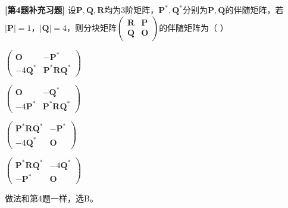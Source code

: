 \begin{question}\textbf{[第4题补充习题]}
    设\(\mathbf{P},\mathbf{Q},\mathbf{R}\)均为\(3\)阶矩阵，\(\mathbf{P}^{*},\mathbf{Q}^{*}\)分别为\(\mathbf{P},\mathbf{Q}\)的伴随矩阵，若\(\vert\mathbf{P}\vert = 1\)，\(\vert\mathbf{Q}\vert = 4\)，则分块矩阵\(\left(\begin{array}{ll}\mathbf{R}&\mathbf{P}\\\mathbf{Q}&\mathbf{O}\end{array}\right)\)的伴随矩阵为（ \qquad ）
    \begin{choices}
        \item \(\left(\begin{array}{cc}\mathbf{O}& - \mathbf{P}^{*}\\-4\mathbf{Q}^{*}&\mathbf{P}^{*}\mathbf{R}\mathbf{Q}^{*}\end{array}\right)\)
        \item \(\left(\begin{array}{cc}\mathbf{O}& - \mathbf{Q}^{*}\\-4\mathbf{P}^{*}&\mathbf{P}^{*}\mathbf{R}\mathbf{Q}^{*}\end{array}\right)\)
        \item \(\left(\begin{array}{cc}\mathbf{P}^{*}\mathbf{R}\mathbf{Q}^{*}& - \mathbf{P}^{*}\\-4\mathbf{Q}^{*}&\mathbf{O}\end{array}\right)\)
        \item \(\left(\begin{array}{cc}\mathbf{P}^{*}\mathbf{R}\mathbf{Q}^{*}& - 4\mathbf{Q}^{*}\\- \mathbf{P}^{*}&\mathbf{O}\end{array}\right)\)
    \end{choices}
\end{question}
\begin{solution}
    做法和第4题一样，选B。
\end{solution}
